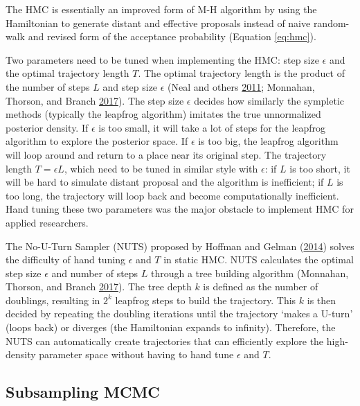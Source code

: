 \documentclass[12pt]{book}
\numberwithin{equation}{chapter}
\begin{document}
The HMC is essentially an improved form of M-H algorithm by using the Hamiltonian to generate distant and effective proposals instead of naive random-walk and revised form of the acceptance probability (Equation \eqref{eq:hmc}).

Two parameters need to be tuned when implementing the HMC: step size \(\epsilon\) and the optimal trajectory length \(T\). The optimal trajectory length is the product of the number of steps \(L\) and step size \(\epsilon\) (Neal and others \protect\hyperlink{ref-neal2011mcmc}{2011}; Monnahan, Thorson, and Branch \protect\hyperlink{ref-monnahan2017faster}{2017}). The step size \(\epsilon\) decides how similarly the sympletic methods (typically the leapfrog algorithm) imitates the true unnormalized posterior density. If \(\epsilon\) is too small, it will take a lot of steps for the leapfrog algorithm to explore the posterior space. If \(\epsilon\) is too big, the leapfrog algorithm will loop around and return to a place near its original step. The trajectory length \(T = \epsilon L\), which need to be tuned in similar style with \(\epsilon\): if \(L\) is too short, it will be hard to simulate distant proposal and the algorithm is inefficient; if \(L\) is too long, the trajectory will loop back and become computationally inefficient. Hand tuning these two parameters was the major obstacle to implement HMC for applied researchers.

The No-U-Turn Sampler (NUTS) proposed by Hoffman and Gelman (\protect\hyperlink{ref-hoffman2014no}{2014}) solves the difficulty of hand tuning \(\epsilon\) and \(T\) in static HMC. NUTS calculates the optimal step size \(\epsilon\) and number of steps \(L\) through a tree building algorithm (Monnahan, Thorson, and Branch \protect\hyperlink{ref-monnahan2017faster}{2017}). The tree depth \(k\) is defined as the number of doublings, resulting in \(2^k\) leapfrog steps to build the trajectory. This \(k\) is then decided by repeating the doubling iterations until the trajectory `makes a U-turn' (loops back) or diverges (the Hamiltonian expands to infinity). Therefore, the NUTS can automatically create trajectories that can efficiently explore the high-density parameter space without having to hand tune \(\epsilon\) and \(T\).

\hypertarget{subsampling-mcmc}{%
\subsection{Subsampling MCMC}\label{subsampling-mcmc}}
\end{document}
